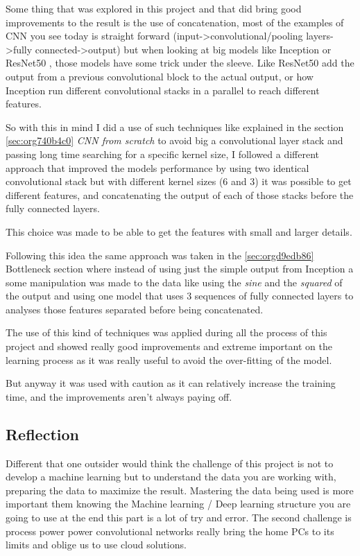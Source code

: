 \documentclass[11pt]{article}
\begin{document}
Some thing that was explored in this project and that did bring good
improvements to the result is the use of concatenation, most of the examples
of CNN you see today is straight forward (input->convolutional/pooling
layers->fully connected->output) but when looking at big models like
Inception or ResNet50 , those models have some trick under the sleeve.
Like ResNet50 add the output from a previous convolutional block to the
actual output, or how Inception run different convolutional stacks in a
parallel to reach different features.

So with this in mind I did a use of such techniques like explained in the
section \ref{sec:org740b4c0} \emph{CNN from scratch} to avoid big a convolutional
layer stack and passing long time searching for a specific kernel size,
I followed a different approach that improved the models performance by using
two identical convolutional stack but with different kernel sizes (6 and 3) 
it was possible to get different features, and concatenating the output of
each of those stacks before the fully connected layers.

This choice was made to be able to get the features with small and larger
details.

Following this idea the same approach was taken in the \ref{sec:orgd9edb86} Bottleneck
section where instead of using just the simple output from Inception a some
manipulation was made to the data like using the \emph{sine} and the \emph{squared} of
the output and using one model that uses 3 sequences of fully connected
layers to analyses those features separated before being concatenated.

The use of this kind of techniques was applied during all the process of this
project and showed really good improvements and extreme important on the
learning process as it was really useful to avoid the over-fitting of the
model.

But anyway it was used with caution as it can relatively increase the
training time, and the improvements aren't always paying off.


\subsection{Reflection}
\label{sec:orgf51b797}

Different that one outsider would think the challenge of this project is not
to develop a machine learning but to understand the data you are working
with, preparing the data to maximize the result.
Mastering the data being used is more important them knowing the Machine
learning / Deep learning structure you are going to use at the end this part
is a lot of try and error. 
The second challenge is process power power convolutional networks really
bring the home PCs to its limits and oblige us to use cloud solutions. 
\end{document}
